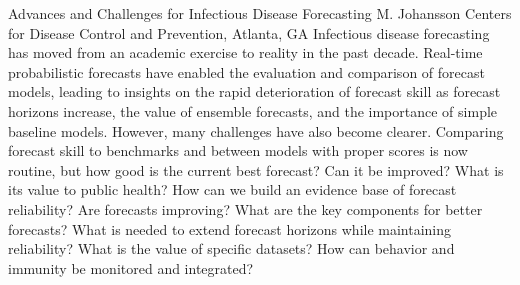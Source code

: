 
    \begin{abstract_online}{Advances and Challenges for Infectious Disease Forecasting }{%
        M. Johansson}{%
        }{%
        Centers for Disease Control and Prevention, Atlanta, GA}
    Infectious disease forecasting has moved from an academic exercise to reality in the past decade. Real-time probabilistic forecasts have enabled the evaluation and comparison of forecast models, leading to insights on the rapid deterioration of forecast skill as forecast horizons increase, the value of ensemble forecasts, and the importance of simple baseline models. However, many challenges have also become clearer. Comparing forecast skill to benchmarks and between models with proper scores is now routine, but how good is the current best forecast? Can it be improved? What is its value to public health? How can we build an evidence base of forecast reliability? Are forecasts improving? What are the key components for better forecasts? What is needed to extend forecast horizons while maintaining reliability? What is the value of specific datasets? How can behavior and immunity be monitored and integrated? 
    
    \end{abstract_online}
    